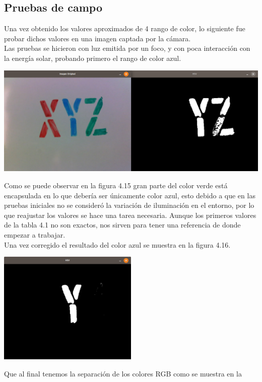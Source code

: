 \subsection{Pruebas de campo}
Una vez obtenido los valores aproximados de 4 rango de color, lo siguiente fue probar
dichos valores en una imagen captada por la cámara.\\
Las pruebas se hicieron con luz emitida por un foco, y con poca interacción con la
energía solar, probando primero el rango de color azul.
\begin{center}
	\includegraphics[width=0.90 \textwidth]{Contenido/Cuerpo/Capitulo4/Fig7.eps}
	\label{Fig7}
\end{center}
Como se puede observar en la figura 4.15 gran parte del color verde está encapsulada
en lo que debería ser únicamente color azul, esto debido a que en las pruebas iniciales
no se consideró la variación de iluminación en el entorno, por lo que reajustar los
valores se hace una tarea necesaria. Aunque los primeros valores de la tabla 4.1
no son exactos, nos sirven para tener una referencia de donde empezar a trabajar.\\
Una vez corregido el resultado del color azul se muestra en la figura 4.16.
\begin{center}
	\includegraphics[width=0.5\textwidth]{Contenido/Cuerpo/Capitulo4/Fig9.eps}
	\label{Fig8}
\end{center}
Que al final tenemos la separación de los colores RGB como se muestra en la
